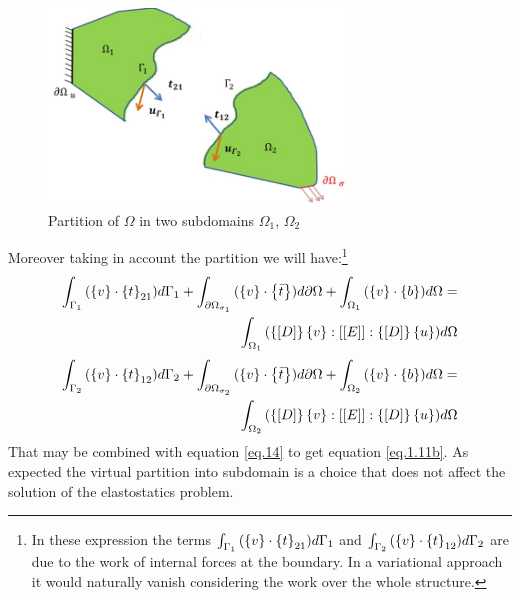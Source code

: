  \begin{figure}[ht]
 \centering
 \includegraphics[width=8cm]{images/Ch1/free_body}
 \caption{Partition of $\Omega$ in two subdomains $\Omega_1$, $\Omega_2$} 
 \label{fig.1.5}
 \end{figure}
 
 Moreover taking in account the partition we will have:\footnote{In these expression the terms $\int_{\Gamma_1}{(\left\lbrace{v}\right \rbrace \cdot \left\lbrace{t}\right \rbrace_{21} )d\Gamma_1}$ and $\int_{\Gamma_2}{(\left\lbrace{v}\right \rbrace \cdot \left\lbrace{t}\right \rbrace_{12} )d\Gamma_2}$ are due to the work of internal forces at the boundary. In a variational approach it would naturally vanish considering the work over the whole structure.}
 \begin{equation}
 \begin{aligned}
 \label{eq.15}
 \int_{\Gamma_1}{(\left\lbrace{v}\right \rbrace \cdot \left\lbrace{t}\right \rbrace_{21} )d\Gamma_1}+\int_{\partial \Omega_{\sigma_1}}{(\left\lbrace{v}\right \rbrace \cdot \left\lbrace{\bar{t}}\right \rbrace )d\partial \Omega}+\int_{\Omega_1}{(\left\lbrace{v}\right \rbrace \cdot \left\lbrace{b}\right \rbrace) d\Omega} =\\\int_{\Omega_1}{(\left\lbrace{\ensuremath\left[{D}\right]}\right \rbrace \left\lbrace{v}\right \rbrace :\left[{\left[{E}\right]}\right]:\left\lbrace{\ensuremath\left[{D}\right]}\right \rbrace \left\lbrace{u}\right \rbrace  )d\Omega}
 \end{aligned}
 \end{equation}
 \begin{equation}
 \begin{split}
 \label{eq.16}
 \int_{\Gamma_2}{(\left\lbrace{v}\right \rbrace \cdot \left\lbrace{t}\right \rbrace_{12} )d\Gamma_2}+\int_{\partial \Omega_{\sigma_2}}{(\left\lbrace{v}\right \rbrace \cdot \left\lbrace{\bar{t}}\right \rbrace )d\partial \Omega}+\int_{ \Omega_2}{(\left\lbrace{v}\right \rbrace \cdot \left\lbrace{b}\right \rbrace) d\Omega}=\\\int_{ \Omega_2}{(\left\lbrace{\ensuremath\left[{D}\right]}\right \rbrace \left\lbrace{v}\right \rbrace :\left[{\left[{E}\right]}\right]:\left\lbrace{\ensuremath\left[{D}\right]}\right \rbrace \left\lbrace{u}\right \rbrace  )d\Omega}
 \end{split}
 \end{equation}
 That may be combined with equation \eqref{eq.14} to get equation \eqref{eq.1.11b}.
 As expected the virtual partition into subdomain is a choice that does not affect the solution of the elastostatics problem.   
 \\
